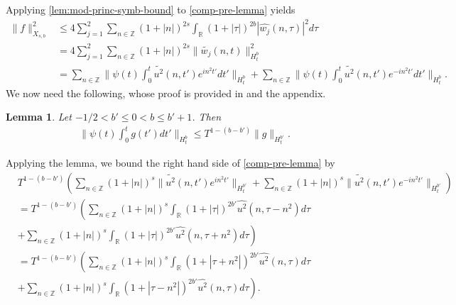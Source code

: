 \documentclass[12pt,reqno]{amsart}
\numberwithin{equation}{section}  %
\numberwithin{figure}{section}
\newcommand{\rr}{\mathbb{R}}
\newcommand{\zz}{\mathbb{Z}}
\newcommand{\wh}{\widehat}
\newcommand{\wt}{\widetilde}
\theoremstyle{plain}
\newtheorem{lemma}{Lemma}
\theoremstyle{definition}
\theoremstyle{remark}
\begin{document}
%
%
Applying \autoref{lem:mod-princ-symb-bound} to \eqref{comp-pre-lemma} yields
%
%
\begin{equation*}
\begin{split}
\| f \|_{X_{s,b}}^{2}
  & \le 4 \sum_{j=1}^{2}  \sum_{n \in \zz} (1 + |n|)^{2s} \int_{\rr} (1 + |
  \tau|)^{2b} | \wh{w_{j}}(n, \tau)|^2 d \tau
  \\
  & = 4 \sum_{j=1}^{2} \sum_{n \in \zz} (1 + |n|)^{2s} \|\wt{w_{j}}(n, t)
  \|^{2}_{H_{t}^{b}}
  \\
  & = \sum_{n \in \zz} \| \psi(t) \int_{0}^{t} \wt{u^2}(n, t')
  e^{in^{2}t'}dt'  \|_{H_{t}^{b}}
  + 
  \sum_{n \in \zz} \| \psi(t) \int_{0}^{t} \wt{u^2}(n, t')
  e^{-in^{2}t'}dt'  \|_{H_{t}^{b}}.
\end{split}
\end{equation*}
%
We now need the following, whose proof is provided in \cite{Ginibre:1996fk} and the appendix.
%
%
%
%
%
%
%
%
\begin{lemma}
Let $-1/2 < b' \le 0 < b \le b' + 1$. Then
%
%
\begin{equation*}
\begin{split}
  \| \psi(t) \int_{0}^{t} g(t') dt' \|_{H^{b}_{t}} \le T^{1-(b-b')} \| g
  \|_{H_{t}^{b'}}.
\end{split}
\end{equation*}
%
%
\label{lem:pre-bilin-est}
\end{lemma}
%
%
Applying the lemma, we bound the right hand side of \eqref{comp-pre-lemma} by
%
%
\begin{equation*}
\begin{split}
  & T^{1-(b - b')} \left( \sum_{n \in \zz} (1 + |n|)^{s} \| \wt{u^{2}}(n, t')
  e^{in^{2}t'} \|_{H_{t}^{b'}}  +
  \sum_{n \in \zz} (1 + |n|)^{s} \| \wt{u^{2}}(n, t')
  e^{-in^{2}t'} \|_{H_{t}^{b'}} \right)
  \\
  & = T^{1-(b -b')}\left( \sum_{n \in \zz} (1 + |n|)^{s} \int_{\rr} (1 + | \tau
  |)^{2b'} \wh{u^{2}}(n, \tau - n^{2}) d \tau \right. 
  \\
  & +
  \left . \sum_{n \in \zz} (1 + |n|)^{s} \int_{\rr} (1 + | \tau
  |)^{2b'} \wh{u^{2}}(n, \tau + n^{2}) d \tau  \right)
  \\
  & = T^{1-(b -b')}\left( \sum_{n \in \zz} (1 + |n|)^{s} \int_{\rr} (1 + | \tau
  + n^{2}
  |)^{2b'} \wh{u^{2}}(n, \tau ) d \tau \right .
  \\
  & +
  \left. \sum_{n \in \zz} (1 + |n|)^{s} \int_{\rr} (1 + | \tau
  - n^{2} |)^{2b'} \wh{u^{2}}(n, \tau) d \tau  \right).
\end{split}
\end{equation*}
\end{document}
